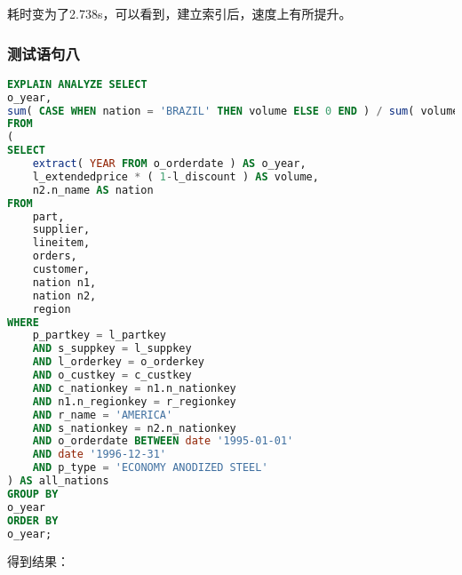 \documentclass{article}
\begin{document}
耗时变为了2.738s，可以看到，建立索引后，速度上有所提升。

\subsubsection{测试语句八}

\begin{lstlisting}[language=sql]
EXPLAIN ANALYZE SELECT
o_year,
sum( CASE WHEN nation = 'BRAZIL' THEN volume ELSE 0 END ) / sum( volume ) AS mkt_share 
FROM
(
SELECT
    extract( YEAR FROM o_orderdate ) AS o_year,
    l_extendedprice * ( 1-l_discount ) AS volume,
    n2.n_name AS nation 
FROM
    part,
    supplier,
    lineitem,
    orders,
    customer,
    nation n1,
    nation n2,
    region 
WHERE
    p_partkey = l_partkey 
    AND s_suppkey = l_suppkey 
    AND l_orderkey = o_orderkey 
    AND o_custkey = c_custkey 
    AND c_nationkey = n1.n_nationkey 
    AND n1.n_regionkey = r_regionkey 
    AND r_name = 'AMERICA' 
    AND s_nationkey = n2.n_nationkey 
    AND o_orderdate BETWEEN date '1995-01-01' 
    AND date '1996-12-31' 
    AND p_type = 'ECONOMY ANODIZED STEEL' 
) AS all_nations 
GROUP BY
o_year 
ORDER BY
o_year;
\end{lstlisting}

得到结果：
\end{document}
